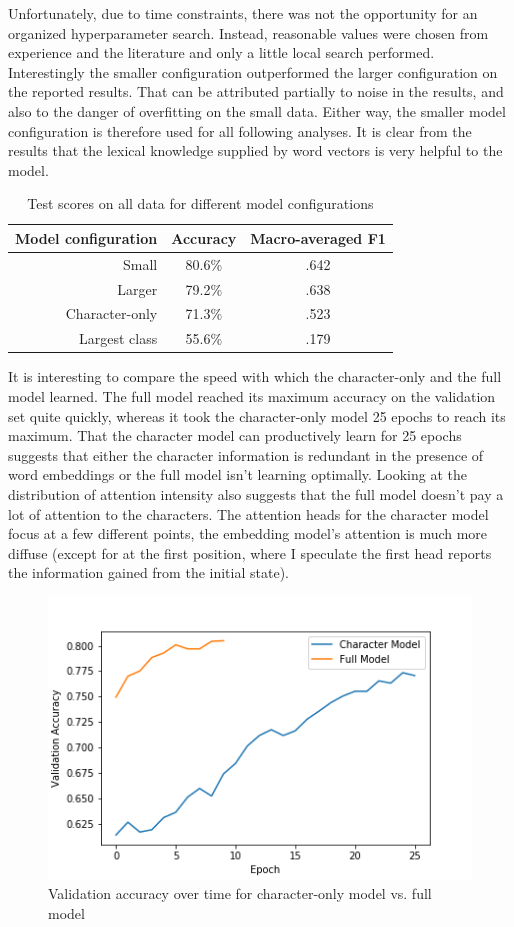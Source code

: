 \documentclass[letterpaper]{article} %
\begin{document}
Unfortunately,
due to time constraints,
there was not the opportunity for an organized hyperparameter search.
Instead,
reasonable values were chosen from experience and the literature
and only a little local search performed.
Interestingly the smaller configuration outperformed the larger configuration
on the reported results.
That can be attributed partially to noise in the results,
and also to the danger of overfitting on the small data.
Either way,
the smaller model configuration is therefore used for all following analyses.
It is clear from the results that the lexical knowledge supplied by word vectors
is very helpful to the model.

\begin{table}
  \centering
  \caption{Test scores on all data for different model configurations}
  \begin{tabular}{r | c | c}
    Model configuration & Accuracy & Macro-averaged F1 \\
    \hline
    Small & 80.6\% &  .642 \\
    Larger & 79.2\% & .638 \\
    Character-only & 71.3\% & .523 \\
    Largest class & 55.6\% & .179 \\
  \end{tabular}
\end{table}

It is interesting to compare the speed with which the character-only
and the full model learned.
The full model reached its maximum accuracy on the validation set quite quickly,
whereas it took the character-only model 25 epochs to reach its maximum.
That the character model can productively learn for 25 epochs
suggests that either the character information is redundant
in the presence of word embeddings
or the full model isn't learning optimally.
Looking at the distribution of attention intensity
also suggests that the full model doesn't pay a lot of attention to the characters.
The attention heads for the character model focus at a few different points,
the embedding model's attention is much more diffuse
(except for at the first position,
where I speculate the first head reports
the information gained from the initial state).

\begin{figure}
  \includegraphics[width=.45\textwidth]{training-speed-comparison}
  \caption{Validation accuracy over time for character-only model vs. full model}
\end{figure}
\end{document}
